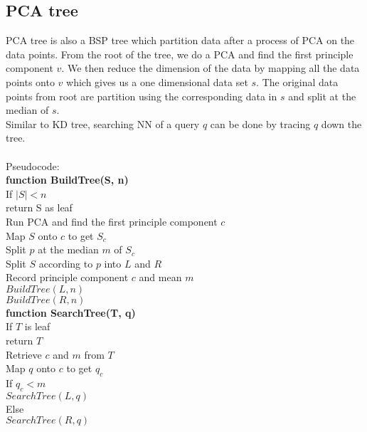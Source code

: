\documentclass[paper=letter, fontsize=12pt]{article} %
\begin{document}
\subsection{PCA tree}
PCA tree is also a BSP tree which partition data after a process of PCA on the data points. From the root of the tree, we do a PCA and find the first principle component $v$. We then reduce the dimension of the data by mapping all the data points onto $v$ which gives us a one dimensional data set $s$. The original data points from root are partition using the corresponding data in $s$ and split at the median of $s$.\\
Similar to KD tree, searching NN of a query $q$ can be done by tracing $q$ down the tree.
\\~\\
Pseudocode:\\
\hspace*{1em} \textbf{function BuildTree(S, n)}\\
\hspace*{2em} If $|S| < n$\\
\hspace*{3em} return S as leaf\\
\hspace*{2em} Run PCA and find the first principle component $c$\\
\hspace*{2em} Map $S$ onto $c$ to get $S_c$\\
\hspace*{2em} Split $p$ at the median $m$ of $S_c$\\
\hspace*{2em} Split $S$ according to $p$ into $L$ and $R$\\
\hspace*{2em} Record principle component $c$ and mean $m$\\
\hspace*{2em} $BuildTree(L, n)$\\
\hspace*{2em} $BuildTree(R, n)$\\
\hspace*{1em} \textbf{function SearchTree(T, q)}\\
\hspace*{2em} If $T$ is leaf\\
\hspace*{3em} return $T$\\
\hspace*{2em} Retrieve $c$ and $m$ from $T$\\
\hspace*{2em} Map $q$ onto $c$ to get $q_c$\\
\hspace*{2em} If $q_c < m$\\
\hspace*{3em} $SearchTree(L, q)$\\
\hspace*{2em} Else\\
\hspace*{3em} $SearchTree(R, q)$
\end{document}
